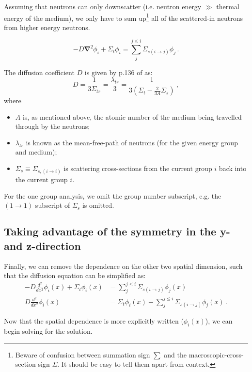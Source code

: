 \documentclass[a4paper, 12pt]{article}
\newcommand{\ve}[1]{\boldsymbol{#1}}
\begin{document}
Assuming that neutrons can only downscatter (i.e. neutron energy $\gg$ thermal energy of the medium), we only have to sum up\footnote{Beware of confusion between summation sign $\sum$ and the macroscopic-cross-section sign $\Sigma$. It should be easy to tell them apart from context.} all of the scattered-in neutrons from higher energy neutrons.

\begin{equation}\label{eq:TransportEqFicksLawGroupwise}
    -D\ve{\nabla}^2\phi_i + \Sigma_t \phi_i =\sum_j^{j\le i} \Sigma_{s(i\rightarrow j)} \phi_j\,.
\end{equation}

The diffusion coefficient $D$ is given by p.136 of \cite{Duderstadt} as:
\begin{equation}
    D = \frac{1}{3\Sigma_{tr}} = \frac{\lambda_{tr}}{3} = \frac{1}{3(\Sigma_t - \frac{2}{3A}{\Sigma_s})}\,,
\end{equation}
where
\begin{itemize}
    \item $A$ is, as mentioned above, the atomic number of the medium being travelled through by the neutrons;
    \item $\lambda_{tr}$ is known as the mean-free-path of neutrons (for the given energy group and medium);
    \item $\Sigma_s \equiv \Sigma_{s,(i\rightarrow i)}$ is scattering cross-sections from the current group $i$ back into the current group $i$.
\end{itemize}
For the one group analysis, we omit the group number subscript, e.g. the $(1\rightarrow 1)$ subscript of $\Sigma_s$ is omitted.

\subsection{Taking advantage of the symmetry in the y- and z-direction}
Finally, we can remove the dependence on the other two spatial dimension, such that the diffusion equation can be simplified as:
\begin{align}
    -D \frac{d^2}{dx^2}\phi_i(x) + \Sigma_t \phi_i(x) &= \sum_j^{j\le i} \Sigma_{s(i\rightarrow j)} \phi_j(x)\\
    D \frac{d^2}{dx^2}\phi_i(x) &= \Sigma_t \phi_i(x)  -\sum_j^{j\le i} \Sigma_{s(i\rightarrow j)} \phi_j(x)\,.\label{eq:TransportEqX}
\end{align}

Now that the spatial dependence is more explicitly written ($\phi_i(x)$), we can begin solving for the solution.
\end{document}
